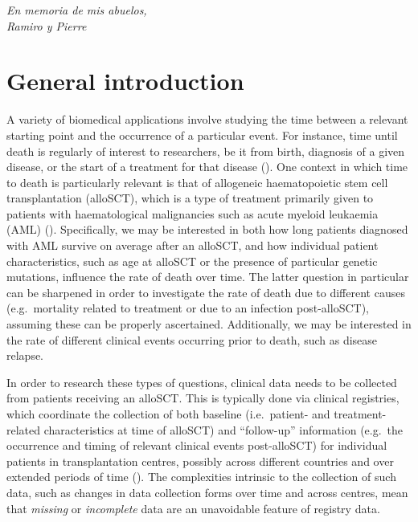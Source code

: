 \documentclass[
  letterpaper,
  paper=240mm:170mm,
  twoside=true,
  open=right,
  fontsize=10pt,
  pagesize=false,
  BCOR=15mm,
  DIV=14,
  headinclude=true,
  footinclude=false,
  headsepline=on]{scrbook}
\renewcommand*\contentsname{Table of contents}
\newcommand\contentsname{Table of contents}
\begin{document}
\clearpage
\thispagestyle{empty}

\begingroup
  \hspace{0pt}
  \vfill
  \flushright \textit{En memoria de mis abuelos,\\Ramiro y Pierre}
  \vfill
  \hspace{0pt}
\endgroup
\renewcommand*\contentsname{Table of contents}
{
\setcounter{tocdepth}{1}
\tableofcontents
}

\mainmatter
{}

\chapter{General introduction}\label{general-introduction}

A variety of biomedical applications involve studying the time between a
relevant starting point and the occurrence of a particular event. For
instance, time until death is regularly of interest to researchers, be
it from birth, diagnosis of a given disease, or the start of a treatment
for that disease
(). One context in which time to death is
particularly relevant is that of allogeneic haematopoietic stem cell
transplantation (alloSCT), which is a type of treatment primarily given
to patients with haematological malignancies such as acute myeloid
leukaemia (AML)
(). Specifically, we may be interested in both how
long patients diagnosed with AML survive on average after an alloSCT,
and how individual patient characteristics, such as age at alloSCT or
the presence of particular genetic mutations, influence the rate of
death over time. The latter question in particular can be sharpened in
order to investigate the rate of death due to different causes
(e.g.~mortality related to treatment or due to an infection
post-alloSCT), assuming these can be properly ascertained. Additionally,
we may be interested in the rate of different clinical events occurring
prior to death, such as disease relapse.

In order to research these types of questions, clinical data needs to be
collected from patients receiving an alloSCT. This is typically done via
clinical registries, which coordinate the collection of both baseline
(i.e.~patient- and treatment-related characteristics at time of alloSCT)
and ``follow-up'' information (e.g.~the occurrence and timing of
relevant clinical events post-alloSCT) for individual patients in
transplantation centres, possibly across different countries and over
extended periods of time
().
The complexities intrinsic to the collection of such data, such as
changes in data collection forms over time and across centres, mean that
\emph{missing} or \emph{incomplete} data are an unavoidable feature of
registry data.
\end{document}
